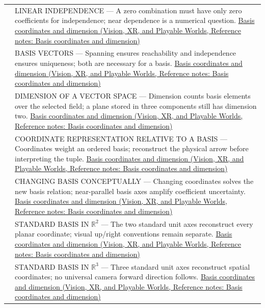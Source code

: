 {\begin{longtable}[]{@{}
  >{\raggedright\arraybackslash}p{}
  >{\raggedright\arraybackslash}p{}@{}}
511 & LINEAR INDEPENDENCE --- A zero combination must have only zero coefficients for independence; near dependence is a numerical question. \href{../07-Vision-XR-and-Playable-Worlds/main.pdf\#nameddest=appendix-ce0341f7ea0d}{Basis coordinates and dimension (Vision, XR, and Playable Worlds, Reference notes: Basis coordinates and dimension)} \\
512 & BASIS VECTORS --- Spanning ensures reachability and independence ensures uniqueness; both are necessary for a basis. \href{../07-Vision-XR-and-Playable-Worlds/main.pdf\#nameddest=appendix-ce0341f7ea0d}{Basis coordinates and dimension (Vision, XR, and Playable Worlds, Reference notes: Basis coordinates and dimension)} \\
513 & DIMENSION OF A VECTOR SPACE --- Dimension counts basis elements over the selected field; a plane stored in three components still has dimension two. \href{../07-Vision-XR-and-Playable-Worlds/main.pdf\#nameddest=appendix-ce0341f7ea0d}{Basis coordinates and dimension (Vision, XR, and Playable Worlds, Reference notes: Basis coordinates and dimension)} \\
514 & COORDINATE REPRESENTATION RELATIVE TO A BASIS --- Coordinates weight an ordered basis; reconstruct the physical arrow before interpreting the tuple. \href{../07-Vision-XR-and-Playable-Worlds/main.pdf\#nameddest=appendix-ce0341f7ea0d}{Basis coordinates and dimension (Vision, XR, and Playable Worlds, Reference notes: Basis coordinates and dimension)} \\
515 & CHANGING BASIS CONCEPTUALLY --- Changing coordinates solves the new basis relation; near-parallel basis axes amplify coefficient uncertainty. \href{../07-Vision-XR-and-Playable-Worlds/main.pdf\#nameddest=appendix-ce0341f7ea0d}{Basis coordinates and dimension (Vision, XR, and Playable Worlds, Reference notes: Basis coordinates and dimension)} \\
516 & STANDARD BASIS IN \(\mathbb R^2\) --- The two standard unit axes reconstruct every planar coordinate; visual up/right conventions remain separate. \href{../07-Vision-XR-and-Playable-Worlds/main.pdf\#nameddest=appendix-ce0341f7ea0d}{Basis coordinates and dimension (Vision, XR, and Playable Worlds, Reference notes: Basis coordinates and dimension)} \\
517 & STANDARD BASIS IN \(\mathbb R^3\) --- Three standard unit axes reconstruct spatial coordinates; no universal camera forward direction follows. \href{../07-Vision-XR-and-Playable-Worlds/main.pdf\#nameddest=appendix-ce0341f7ea0d}{Basis coordinates and dimension (Vision, XR, and Playable Worlds, Reference notes: Basis coordinates and dimension)} \\

\end{longtable}}
